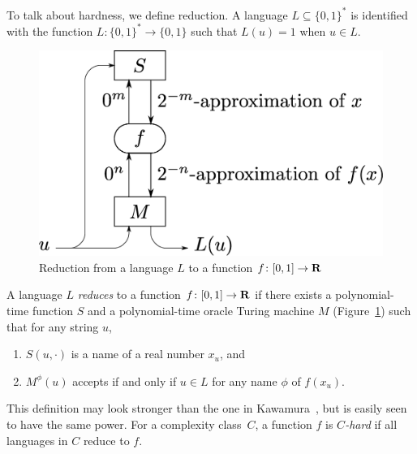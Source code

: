 To talk about hardness, we define reduction. 
A language $L \subseteq \{0, 1\} ^*$ is identified with the function
$L \colon \{0, 1\} ^* \to \{0, 1\}$ such that $L (u) = 1$ when $u \in L$.

 \begin{figure}[tb]
  \begin{center}
  \includegraphics[scale=0.20]{image/reduction.eps}
  \caption{Reduction from a language $L$ to a function $f \colon [0,1] \to \mathbf R$}
  \label{fig:reduction}
  \end{center}
 \end{figure}

\begin{definition}
 A language $L$ \emph{reduces} to a function $f \colon [0, 1] \to \mathbf R$
 if there exists a polynomial-time function $S$ and a polynomial-time oracle Turing machine $M$ (Figure~\ref{fig:reduction})
 such that for any string $u$, 
  \begin{enumerate}
   \item $S(u, \cdot)$ is a name of a real number $x_u$, and 
   \item $M^\phi(u)$ accepts if and only if $u \in L$ for any name $\phi$ of $f(x_u)$.
  \end{enumerate}
\end{definition}
This definition may look stronger than
the one in Kawamura~\cite{kawamura2010lipschitz}, 
but is easily seen to have the same power.
For a complexity class~$C$, a function $f$ is \emph{$C$-hard}
if all languages in $C$ reduce to $f$.
